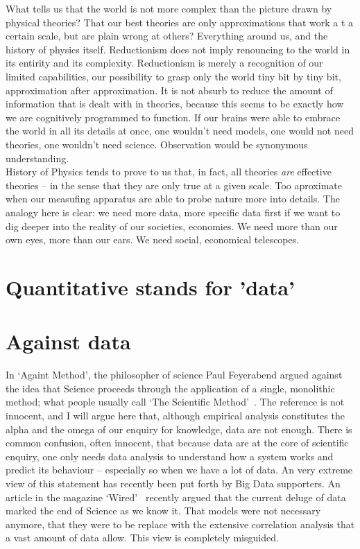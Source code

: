 What tells us that the world is not more complex than the picture drawn by
physical theories? That our best theories are only approximations that work a t
a certain scale, but are plain wrong at others? Everything around us, and the
history of physics itself. Reductionism does not imply renouncing to the world
in its entirity and its complexity. Reductionism is merely a recognition of our
limited capabilities, our possibility to grasp only the world tiny bit by tiny
bit, approximation after approximation. It is not absurb to reduce the amount of
information that is dealt with in theories, because this seems to be exactly how
we are cognitively programmed to function. If our brains were able to embrace
the world in all its details at once, one wouldn't need models, one would not
need theories, one wouldn't need science. Observation would be synonymous 
understanding.\\
History of Physics tends to prove to us that, in fact, all theories \emph{are}
effective theories -- in the sense that they are only true at a given scale. Too
aproximate when our measufing apparatus are able to probe nature more into
details. The analogy here is clear: we need more data, more specific data first
if we want to dig deeper into the reality of our societies, economies. We need
more than our own eyes, more than our ears. We need social, economical
telescopes.

\section{Quantitative stands for 'data'}
\label{sec:quantitative_stands_for_data_}

\section{Against data}
\label{sec:against_data}

In `Againt Method', the philosopher of science Paul Feyerabend argued against
the idea that Science proceeds through the application of a single, monolithic
method; what people usually call `The Scientific Method'~\cite{Feyerabend:1975}.
The reference is not innocent, and I will argue here that, although empirical
analysis constitutes the alpha and the omega of our enquiry for knowledge, data
are not enough.
There is common confusion, often innocent, that because data are at the core of
scientific enquiry, one only needs data analysis to understand how a system
works and predict its behaviour -- especially so when we have a lot of data. An
very extreme view of this statement has recently been put forth by Big Data
supporters. An article in the magazine `Wired'~\cite{Anderson:2008} recently
argued that the current deluge of data marked the end of Science as we know it.
That models were not necessary anymore, that they were to be replace with the
extensive correlation analysis that a vast amount of data allow. This view is
completely misguided.\\

